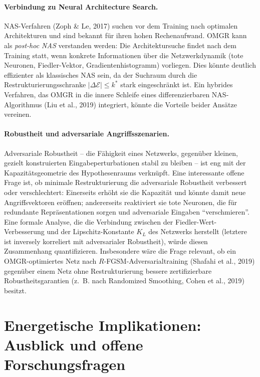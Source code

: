 ﻿\documentclass[12pt, a4paper, openany]{report}
\newcommand{\calE}{\mathcal{E}}
\begin{document}
\paragraph{Verbindung zu Neural Architecture Search.}
NAS-Verfahren (Zoph \& Le, 2017) suchen vor dem Training nach optimalen
Architekturen und sind bekannt für ihren hohen Rechenaufwand.  OMGR
kann als \emph{post-hoc NAS} verstanden werden: Die Architektursuche
findet nach dem Training statt, wenn konkrete Informationen über die
Netzwerkdynamik (tote Neuronen, Fiedler-Vektor, Gradientenhistogramm)
vorliegen.  Dies könnte deutlich effizienter als klassisches NAS sein,
da der Suchraum durch die Restrukturierungsschranke $|\Delta\calE| \leq k^*$
stark eingeschränkt ist.  Ein hybrides Verfahren, das OMGR in die innere
Schleife eines differenzierbaren NAS-Algorithmus (Liu et al., 2019)
integriert, könnte die Vorteile beider Ansätze vereinen.

\paragraph{Robustheit und adversariale Angriffsszenarien.}
Adversariale Robustheit -- die Fähigkeit eines Netzwerks, gegenüber
kleinen, gezielt konstruierten Eingabeperturbationen stabil zu bleiben --
ist eng mit der Kapazitätsgeometrie des Hypothesenraums verknüpft.
Eine interessante offene Frage ist, ob minimale Restrukturierung die
adversariale Robustheit verbessert oder verschlechtert: Einerseits erhöht
sie die Kapazität und könnte damit neue Angriffsvektoren eröffnen;
andererseits reaktiviert sie tote Neuronen, die für redundante Repräsentationen
sorgen und adversariale Eingaben ``verschmieren''.  Eine formale Analyse,
die die Verbindung zwischen der Fiedler-Wert-Verbesserung und der
Lipschitz-Konstante $K_L$ des Netzwerks herstellt (letztere ist inversely
korreliert mit adversarialer Robustheit), würde diesen Zusammenhang
quantifizieren.  Insbesondere wäre die Frage relevant, ob ein OMGR-optimiertes
Netz nach $R$-FGSM-Adversarialtraining (Shafahi et al., 2019) gegenüber
einem Netz ohne Restrukturierung bessere zertifizierbare Robustheitsgarantien
(z.~B. nach Randomized Smoothing, Cohen et al., 2019) besitzt.

\section{Energetische Implikationen: Ausblick und offene Forschungsfragen}
\label{sec:outlook_energy}
\end{document}

